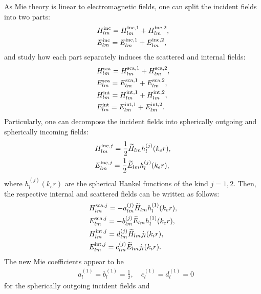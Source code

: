 \documentclass[aps,prb,reprint]{revtex4-2}
\begin{document}
As Mie theory is linear to electromagnetic fields, one can split the incident fields into two parts: 
\begin{eqnarray}
	&\displaystyle 
	H_{lm}^{\rm inc}=H_{lm}^{\rm inc, 1}+H_{lm}^{\rm inc, 2}, \\
	&\displaystyle
	E_{lm}^{\rm inc}=E_{lm}^{\rm inc, 1}+E_{lm}^{\rm inc, 2},
\end{eqnarray}
and study how each part separately induces the scattered and internal fields:
\begin{eqnarray}
	&\displaystyle 
	H_{lm}^{\rm sca}=H_{lm}^{\rm sca, 1}+H_{lm}^{\rm sca, 2}, \\
	&\displaystyle
	E_{lm}^{\rm sca}=E_{lm}^{\rm sca, 1}+E_{lm}^{\rm sca, 2}, \\
	&\displaystyle 
	H_{lm}^{\rm int}=H_{lm}^{\rm int, 1}+H_{lm}^{\rm int, 2}, \\
	&\displaystyle
	E_{lm}^{\rm int}=E_{lm}^{\rm int, 1}+E_{lm}^{\rm int, 2}.
\end{eqnarray}
Particularly, one can decompose the incident fields into spherically outgoing and spherically incoming fields:
\begin{eqnarray}
	&\displaystyle 
	H_{lm}^{{\rm inc},j}=\frac{1}{2}\widetilde{H}_{lm}h_l^{(j)}(k_e r), \\
	&\displaystyle
	E_{lm}^{{\rm inc},j}=\frac{1}{2}\widetilde{E}_{lm}h_l^{(j)}(k_e r),
\end{eqnarray}
where $h_l^{(j)}(k_e r)$ are the spherical Hankel functions of the kind $j=1,2$.
Then, the respective internal and scattered fields can be written as follows:
\begin{eqnarray}
	&\displaystyle 
	H_{lm}^{{\rm sca},j}=-a_{lm}^{(j)}\widetilde{H}_{lm} h_l^{(1)}(k_e r), \\
	&\displaystyle 
	E_{lm}^{{\rm sca},j}=-b_{lm}^{(j)} \widetilde{E}_{lm} h_l^{(1)}(k_e r),\\
	&\displaystyle 
	H_{lm}^{{\rm int},j}= d_{lm}^{(j)} \widetilde{H}_{lm} j_l(k_i r),\\
	&\displaystyle 
	E_{lm}^{{\rm int},j}= c_{lm}^{(j)} \widetilde{E}_{lm} j_l(k_i r).
\end{eqnarray}
The new Mie coefficients appear to be
\begin{eqnarray}
	&\displaystyle 
	a_{l}^{(1)}=
	b_{l}^{(1)}=\frac{1}{2},
	\quad c_{l}^{(1)}=
	d_{l}^{(1)}=0
\label{S:cd_l1}
\end{eqnarray}
for the spherically outgoing incident fields and 
\end{document}
